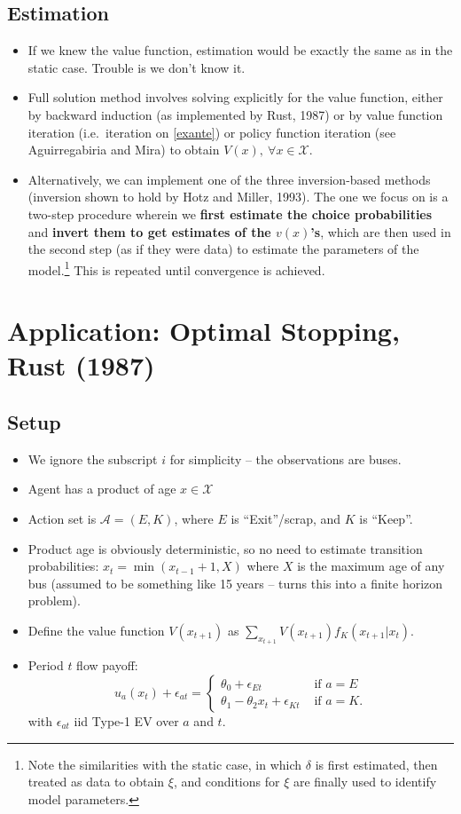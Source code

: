 \documentclass[11pt]{article}
\begin{document}
\subsection*{Estimation}
	\begin{itemize}
		\item If we knew the value function, estimation would be exactly the same as in the static case. Trouble is we don't know it.
		\item Full solution method involves solving explicitly for the value function, either by backward induction (as implemented by Rust, 1987) or by value function iteration (i.e.\ iteration on \eqref{exante}) or policy function iteration (see Aguirregabiria and Mira) to obtain $V(x),~\forall x\in \mathcal{X}$.
		\item Alternatively, we can implement one of the three inversion-based methods (inversion shown to hold by Hotz and Miller, 1993). The one we focus on is a two-step procedure wherein we \textbf{first estimate the choice probabilities} and \textbf{invert them to get estimates of the $v(x)$'s}, which are then used in the second step (as if they were data) to estimate the parameters of the model.\footnote{Note the similarities with the static case, in which $\delta$ is first estimated, then treated as data to obtain $\xi$, and conditions for $\xi$ are finally used to identify model parameters.} This is repeated until convergence is achieved.
	\end{itemize}

\section{Application: Optimal Stopping, Rust (1987)}
	\subsection{Setup}
	\begin{itemize}
	\item We ignore the subscript $i$ for simplicity -- the observations are buses.
	\item Agent has a product of age $x\in \mathcal{X}$
	\item Action set is $\mathcal{A}=(E,K)$, where $E$ is ``Exit''/scrap, and $K$ is ``Keep''.
	\item Product age is obviously deterministic, so no need to estimate transition probabilities: $x_{t} = \min{}(x_{t-1}+1, X)$ where $X$ is the maximum age of any bus (assumed to be something like 15 years -- turns this into a finite horizon problem).
	\item Define the value function $V(x_{t+1})$ as $\sum_{x_{t+1}} V(x_{t+1})f_K(x_{t+1}|x_t)$.
	\item Period $t$ flow payoff:
	\begin{equation}
	u_a(x_t)+\epsilon_{at} =
	\begin{cases}
	\theta_0 + \epsilon_{Et} & \text{ if } a = E \\
	\theta_1 - \theta_2 x_t + \epsilon_{Kt} & \text{ if } a=K.
	\end{cases}
	\end{equation}
	with $\epsilon_{at}$ iid Type-1 EV over $a$ and $t$.
	\end{itemize}
\end{document}
